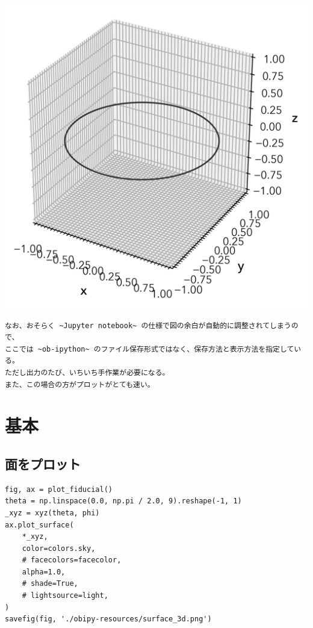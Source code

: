 \documentclass[a4paper, 10pt, notitlepage, twocolumn, uplatex, oneside, dvipdfmx]{jsarticle}
\begin{document}
\label{}
\begin{center}
\includegraphics[width=1.0\linewidth]{./obipy-resources/fiducial_3d.png}
\end{center}

\begin{verbatim}
なお、おそらく ~Jupyter notebook~ の仕様で図の余白が自動的に調整されてしまうので、
ここでは ~ob-ipython~ のファイル保存形式ではなく、保存方法と表示方法を指定している。
ただし出力のたび、いちいち手作業が必要になる。
また、この場合の方がプロットがとても速い。
\end{verbatim}
\section{基本}
\label{sec:org65f27ac}
\subsection{面をプロット}
\label{sec:org7fd12ea}
\begin{verbatim}
fig, ax = plot_fiducial()
theta = np.linspace(0.0, np.pi / 2.0, 9).reshape(-1, 1)
_xyz = xyz(theta, phi)
ax.plot_surface(
    *_xyz,
    color=colors.sky,
    # facecolors=facecolor,
    alpha=1.0,
    # shade=True,
    # lightsource=light,
)
savefig(fig, './obipy-resources/surface_3d.png')
\end{verbatim}
\end{document}
